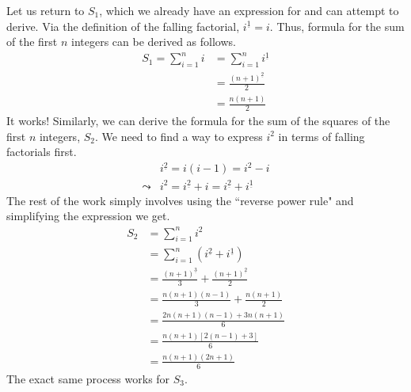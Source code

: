 \documentclass[a4paper]{article}
\theoremstyle{definition}
\begin{document}
Let us return to $S_1$, which we already have an expression for and can attempt to derive.
Via the definition of the falling factorial, $i^{\underline{1}}=i$.
Thus, formula for the sum of the first $n$ integers can be derived as follows.
\begin{align*}
    S_1 = \sum_{i=1}^{n} i & = \sum_{i=1}^{n} i^{\underline{1}} \\
                           & = \frac{(n+1)^{\underline{2}}}{2}  \\
                           & = \frac{n(n+1)}{2}
\end{align*}
It works!
Similarly, we can derive the formula for the sum of the squares of the first $n$ integers, $S_2$.
We need to find a way to express $i^2$ in terms of falling factorials first.
\begin{align*}
             & i^{\underline{2}} = i(i-1) = i^2 - i                                \\
    \leadsto & i^2 = i^{\underline{2}} + i = i^{\underline{2}} + i^{\underline{1}}
\end{align*}
The rest of the work simply involves using the ``reverse power rule" and simplifying the expression we get.
\begin{align*}
    S_2 & = \sum_{i=1}^{n} i^2                                                  \\
        & = \sum_{i=1}^{n} \left( i^{\underline{2}} + i^{\underline{1}} \right) \\
        & = \frac{(n+1)^{\underline{3}}}{3} + \frac{(n+1)^{\underline{2}}}{2}   \\
        & = \frac{n(n+1)(n-1)}{3} + \frac{n(n+1)}{2}                            \\
        & = \frac{2n(n+1)(n-1) + 3n(n+1)}{6}                                    \\
        & = \frac{n(n+1)[2(n-1) + 3]}{6}                                        \\
        & = \frac{n(n+1)(2n+1)}{6}
\end{align*}
The exact same process works for $S_3$.
\end{document}
